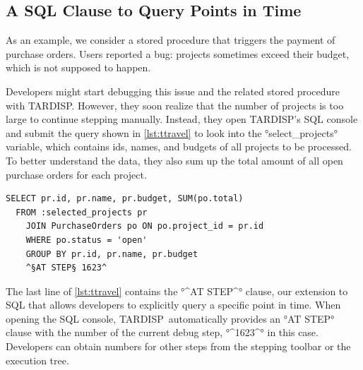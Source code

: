 \documentclass[english,conference]{IEEEtran}
\newcommand{\todo}[2][]{\pdfmargincomment[author={#1}]{#2}}
\newcommand{\tool}{TAR\-DISP}
\begin{document}
\subsection{A SQL Clause to Query Points in Time}

As an example, we consider a stored procedure that triggers the payment of purchase orders.
Users reported a bug: projects sometimes exceed their budget, which is not supposed to happen.

Developers might start debugging this issue and the related stored procedure with \tool.
However, they soon realize that the number of projects is too large to continue stepping manually.
Instead, they open \tool's SQL console and submit the query shown in \cref{lst:ttravel} to look into the °select_projects° variable, which contains ids, names, and budgets of all projects to be processed.
To better understand the data, they also sum up the total amount of all open purchase orders for each project.


\begin{lstlisting}[language=HanaSQL,float,caption={Example for a time-travel query: select the current total of open orders for previously selected projects},label=lst:ttravel]
  SELECT pr.id, pr.name, pr.budget, SUM(po.total)
  FROM :selected_projects pr
	JOIN PurchaseOrders po ON po.project_id = pr.id
	WHERE po.status = 'open'
	GROUP BY pr.id, pr.name, pr.budget
	^§AT STEP§ 1623^
\end{lstlisting}

The last line of \cref{lst:ttravel} contains the °^AT STEP^° clause, our extension to SQL that allows developers to explicitly query a specific point in time.
When opening the SQL console, \tool\ automatically provides an °AT STEP° clause with the number of the current debug step, °^1623^° in this case.
Developers can obtain numbers for other steps from the stepping toolbar or the execution tree. 
\end{document}
